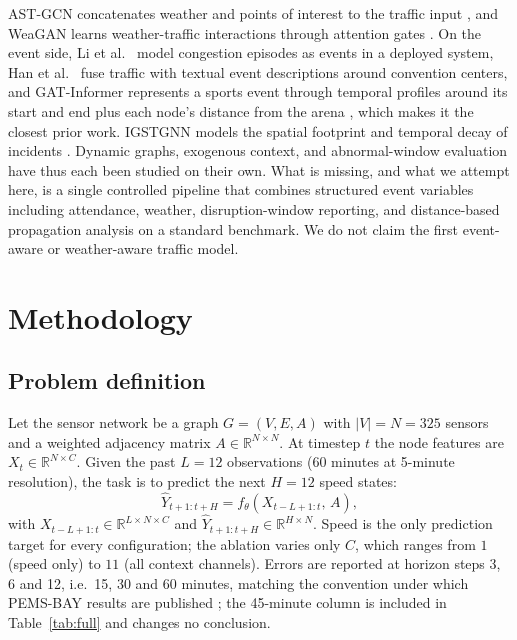 \documentclass[letterpaper]{article}
\begin{document}
AST-GCN concatenates weather and points of interest to the traffic input \cite{zhu2021astgcn}, and WeaGAN learns weather-traffic interactions through attention gates \cite{wang2023weagan}. On the event side, Li et al.~ model congestion episodes as events in a deployed system, Han et al.~ fuse traffic with textual event descriptions around convention centers, and GAT-Informer represents a sports event through temporal profiles around its start and end plus each node's distance from the arena \cite{song2024gatinformer}, which makes it the closest prior work. IGSTGNN models the spatial footprint and temporal decay of incidents \cite{fan2026igstgnn}. Dynamic graphs, exogenous context, and abnormal-window evaluation have thus each been studied on their own. What is missing, and what we attempt here, is a single controlled pipeline that combines structured event variables including attendance, weather, disruption-window reporting, and distance-based propagation analysis on a standard benchmark. We do not claim the first event-aware or weather-aware traffic model.

\section{Methodology}

\subsection{Problem definition}

Let the sensor network be a graph $G=(V,E,A)$ with $|V|=N=325$ sensors and a weighted adjacency matrix $A\in\mathbb{R}^{N\times N}$. At timestep $t$ the node features are $X_t\in\mathbb{R}^{N\times C}$. Given the past $L=12$ observations (60 minutes at 5-minute resolution), the task is to predict the next $H=12$ speed states:
\begin{equation}
\hat{Y}_{t+1:t+H}=f_\theta\!\left(X_{t-L+1:t},\,A\right),
\end{equation}
with $X_{t-L+1:t}\in\mathbb{R}^{L\times N\times C}$ and $\hat{Y}_{t+1:t+H}\in\mathbb{R}^{H\times N}$. Speed is the only prediction target for every configuration; the ablation varies only $C$, which ranges from $1$ (speed only) to $11$ (all context channels). Errors are reported at horizon steps 3, 6 and 12, i.e.\ 15, 30 and 60 minutes, matching the convention under which PEMS-BAY results are published \cite{wu2019graphwavenet}; the 45-minute column is included in Table~\ref{tab:full} and changes no conclusion.
\end{document}
